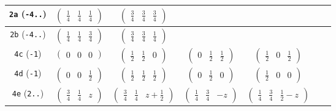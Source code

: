 \documentclass[fleqn,9pt,landscape]{jsarticle}
\begin{document}
\begin{center}
\begin{longtable}{ccccccc}
{\tt 2a} ({\tt -4..}) & $ \begin{pmatrix} \frac{1}{4} & \frac{1}{4} & \frac{1}{4} \end{pmatrix} $ & $ \begin{pmatrix} \frac{3}{4} & \frac{3}{4} & \frac{3}{4} \end{pmatrix} $ & $  $ & $  $ & $  $ & $  $ \\ \hline
{\tt 2b} ({\tt -4..}) & $ \begin{pmatrix} \frac{1}{4} & \frac{1}{4} & \frac{3}{4} \end{pmatrix} $ & $ \begin{pmatrix} \frac{3}{4} & \frac{3}{4} & \frac{1}{4} \end{pmatrix} $ & $  $ & $  $ & $  $ & $  $ \\ \hline
{\tt 4c} ({\tt -1}) & $ \begin{pmatrix} 0 & 0 & 0 \end{pmatrix} $ & $ \begin{pmatrix} \frac{1}{2} & \frac{1}{2} & 0 \end{pmatrix} $ & $ \begin{pmatrix} 0 & \frac{1}{2} & \frac{1}{2} \end{pmatrix} $ & $ \begin{pmatrix} \frac{1}{2} & 0 & \frac{1}{2} \end{pmatrix} $ & $  $ & $  $ \\ \hline
{\tt 4d} ({\tt -1}) & $ \begin{pmatrix} 0 & 0 & \frac{1}{2} \end{pmatrix} $ & $ \begin{pmatrix} \frac{1}{2} & \frac{1}{2} & \frac{1}{2} \end{pmatrix} $ & $ \begin{pmatrix} 0 & \frac{1}{2} & 0 \end{pmatrix} $ & $ \begin{pmatrix} \frac{1}{2} & 0 & 0 \end{pmatrix} $ & $  $ & $  $ \\ \hline
{\tt 4e} ({\tt 2..}) & $ \begin{pmatrix} \frac{3}{4} & \frac{1}{4} & z \end{pmatrix} $ & $ \begin{pmatrix} \frac{3}{4} & \frac{1}{4} & z + \frac{1}{2} \end{pmatrix} $ & $ \begin{pmatrix} \frac{1}{4} & \frac{3}{4} & - z \end{pmatrix} $ & $ \begin{pmatrix} \frac{1}{4} & \frac{3}{4} & \frac{1}{2} - z \end{pmatrix} $ & $  $ & $  $ \\ \hline

\end{longtable}
\end{center}
\end{document}

